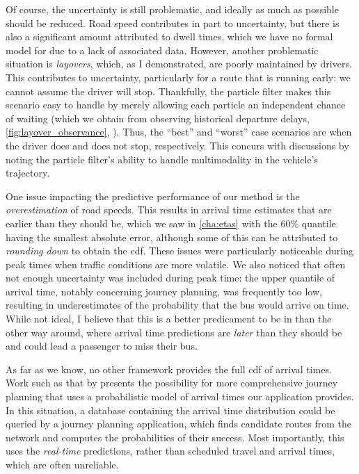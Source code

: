 Of course, the uncertainty is still problematic, and ideally as much as possible should be reduced. Road speed contributes in part to uncertainty, but there is also a significant amount attributed to dwell times, which we have no formal model for due to a lack of associated data. However, another problematic situation is \emph{layovers}, which, as I demonstrated, are poorly maintained by drivers. This contributes to uncertainty, particularly for a route that is running early: we cannot assume the driver will stop. Thankfully, the particle filter makes this scenario easy to handle by merely allowing each particle an independent chance of waiting (which we obtain from observing historical departure delays, \cref{fig:layover_observance}, ). Thus, the ``best'' and ``worst'' case scenarios are when the driver does and does not stop, respectively. This concurs with discussions by \citet{Hans_2015,Ulmke_2006} noting the particle filter's ability to handle multimodality in the vehicle's trajectory.


One issue impacting the predictive performance of our method is the \emph{overestimation} of road speeds. This results in arrival time estimates that are earlier than they should be, which we saw in \cref{cha:etas} with the 60\% quantile having the smallest absolute error, although some of this can be attributed to \emph{rounding down} to obtain the \gls{cdf}. These issues were particularly noticeable during peak times when traffic conditions are more volatile. We also noticed that often not enough uncertainty was included during peak time: the upper quantile of arrival time, notably concerning journey planning, was frequently too low, resulting in underestimates of the probability that the bus would arrive on time. While not ideal, I believe that this is a better predicament to be in than the other way around, where arrival time predictions are \emph{later} than they should be and could lead a passenger to miss their bus.


As far as we know, no other framework provides the full \gls{cdf} of arrival times. Work such as that by \citet{Celan_2017, Celan_2018} presents the possibility for more comprehensive journey planning that uses a probabilistic model of arrival times our application provides. In this situation, a database containing the arrival time distribution could be queried by a journey planning application, which finds candidate routes from the network and computes the probabilities of their success. Most importantly, this uses the \emph{real-time} predictions, rather than scheduled travel and arrival times, which are often unreliable.


